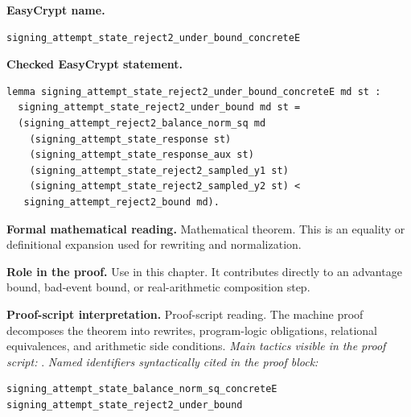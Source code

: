 \begin{formaltheorem}
\noindent\textbf{EasyCrypt name.}
\begin{lstlisting}[language=EasyCrypt,basicstyle=\ttfamily\scriptsize]
signing_attempt_state_reject2_under_bound_concreteE
\end{lstlisting}
\noindent\textbf{Checked EasyCrypt statement.}
\begin{lstlisting}[language=EasyCrypt,basicstyle=\ttfamily\scriptsize]
lemma signing_attempt_state_reject2_under_bound_concreteE md st :
  signing_attempt_state_reject2_under_bound md st =
  (signing_attempt_reject2_balance_norm_sq md
    (signing_attempt_state_response st)
    (signing_attempt_state_response_aux st)
    (signing_attempt_state_reject2_sampled_y1 st)
    (signing_attempt_state_reject2_sampled_y2 st) <
   signing_attempt_reject2_bound md).
\end{lstlisting}
\noindent\textbf{Formal mathematical reading.}
Mathematical theorem. This is an equality or definitional expansion used for rewriting and normalization.

\noindent\textbf{Role in the proof.}
Use in this chapter. It contributes directly to an advantage bound, bad-event bound, or real-arithmetic composition step.

\noindent\textbf{Proof-script interpretation.}
Proof-script reading. The machine proof decomposes the theorem into rewrites, program-logic obligations, relational equivalences, and arithmetic side conditions.
\emph{Main tactics visible in the proof script:} .
\emph{Named identifiers syntactically cited in the proof block:}
\begin{lstlisting}[language=EasyCrypt,basicstyle=\ttfamily\scriptsize]
signing_attempt_state_balance_norm_sq_concreteE
signing_attempt_state_reject2_under_bound
\end{lstlisting}

\end{formaltheorem}

